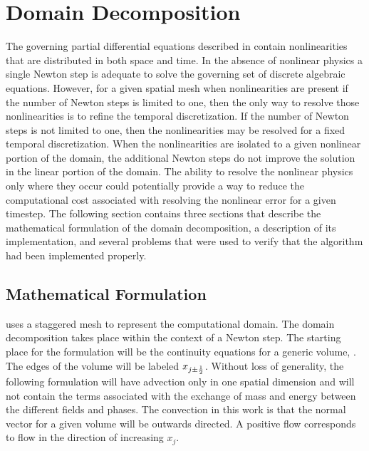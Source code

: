 \chapter{Domain Decomposition}
\label{chap:domain_decomposition}
The governing partial differential equations described in  contain nonlinearities that are distributed in both space and time.
In the absence of nonlinear physics a single Newton step is adequate to solve the governing set of discrete algebraic equations.
However, for a given spatial mesh when nonlinearities are present if the number of Newton steps is limited to one, then the only way to resolve those nonlinearities is to refine the temporal discretization.
If the number of Newton steps is not limited to one, then the nonlinearities may be resolved for a fixed temporal discretization.
When the nonlinearities are isolated to a given nonlinear portion of the domain, the additional Newton steps do not improve the solution in the linear portion of the domain.
The ability to resolve the nonlinear physics only where they occur could potentially provide a way to reduce the computational cost associated with resolving the nonlinear error for a given timestep.
The following section contains three sections that describe the mathematical formulation of the domain decomposition, a description of its implementation, and several problems that were used to verify that the algorithm had been implemented properly.

\section{Mathematical Formulation}
\label{sec:domDecompMath}

\cobra{} uses a staggered mesh to represent the computational domain.
The domain decomposition takes place within the context of a Newton step.
The starting place for the formulation will be the continuity equations for a generic volume,  .
The edges of the volume will be labeled $x_{j \pm \onehalf}$.
Without loss of generality, the following formulation will have advection only in one spatial dimension and will not contain the terms associated with the exchange of mass and energy between the different fields and phases.
The convection in this work is that the normal vector for a given volume will be outwards directed.
A positive flow corresponds to flow in the direction of increasing $x_{j}$.  

